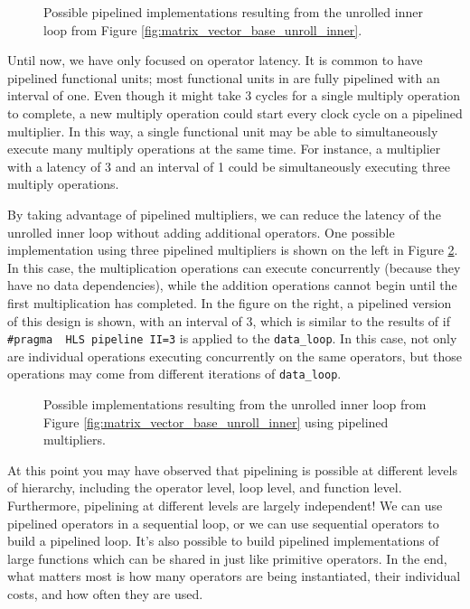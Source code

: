 \begin{figure}
\centering

\caption{Possible pipelined implementations resulting from the unrolled inner loop from Figure \ref{fig:matrix_vector_base_unroll_inner}.}\label{fig:dft_behavior2}
\end{figure}

Until now, we have only focused on operator latency.  It is common to have pipelined functional units; most functional units in \VHLS are fully pipelined with an interval of one. Even though it might take 3 cycles for a single multiply operation to complete, a new multiply operation could start every clock cycle on a pipelined multiplier.  In this way, a single functional unit may be able to simultaneously execute many multiply operations at the same time.  For instance, a multiplier with a latency of 3 and an interval of 1 could be simultaneously executing three multiply operations. 

By taking advantage of pipelined multipliers, we can reduce the latency of the unrolled inner loop without adding additional operators.  One possible implementation using three pipelined multipliers is shown on the left in Figure \ref{fig:dft_behavior_pipelined}.  In this case, the multiplication operations can execute concurrently (because they have no data dependencies), while the addition operations cannot begin until the first multiplication has completed.  In the figure on the right, a pipelined version of this design is shown, with an interval of 3, which is similar to the results of \VHLS if \lstinline|#pragma  HLS pipeline II=3| is applied to the \lstinline|data_loop|.  In this case, not only are individual operations executing concurrently on the same operators, but those operations may come from different iterations of \lstinline|data_loop|.  

\begin{figure}
\centering

\caption{Possible implementations resulting from the unrolled inner loop from Figure \ref{fig:matrix_vector_base_unroll_inner} using pipelined multipliers.}\label{fig:dft_behavior_pipelined}
\end{figure}

At this point you may have observed that pipelining is possible at different levels of hierarchy, including the operator level, loop level, and function level.  Furthermore, pipelining at different levels are largely independent!  We can use pipelined operators in a sequential loop, or we can use sequential operators to build a pipelined loop.  It's also possible to build pipelined implementations of large functions which can be shared in \VHLS just like primitive operators.  In the end, what matters most is how many operators are being instantiated, their individual costs, and how often they are used.


